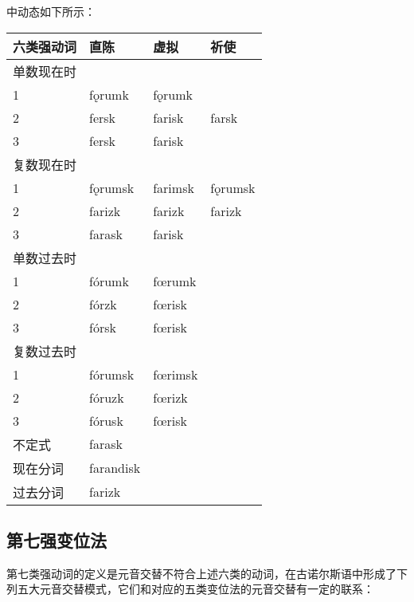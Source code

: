 中动态如下所示：

\begin{longtable}{llll}
    \toprule
    六类强动词 & 直陈        & 虚拟      & 祈使      \\
    \midrule
    \endhead
    \bottomrule
    \endfoot
    单数现在时 &           &         &         \\
    1     & fǫrumk    & fǫrumk  &         \\
    2     & fersk     & farisk  & farsk   \\
    3     & fersk     & farisk  &         \\
    复数现在时 &           &         &         \\
    1     & fǫrumsk   & farimsk & fǫrumsk \\
    2     & farizk    & farizk  & farizk  \\
    3     & farask    & farisk  &         \\
    单数过去时 &           &         &         \\
    1     & fórumk    & fœrumk  &         \\
    2     & fórzk     & fœrisk  &         \\
    3     & fórsk     & fœrisk  &         \\
    复数过去时 &           &         &         \\
    1     & fórumsk   & fœrimsk &         \\
    2     & fóruzk    & fœrizk  &         \\
    3     & fórusk    & fœrisk  &         \\
    不定式   & farask    &         &         \\
    现在分词  & farandisk &         &         \\
    过去分词  & farizk    &         &         \\
\end{longtable}

\subsection{第七强变位法}\label{第七强变位法}

第七类强动词的定义是元音交替不符合上述六类的动词，在古诺尔斯语中形成了下列五大元音交替模式，它们和对应的五类变位法的元音交替有一定的联系：


